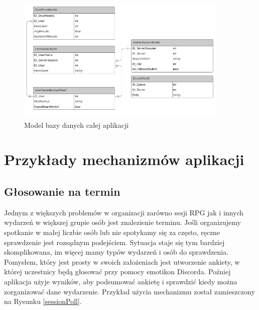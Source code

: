 \documentclass[shortabstract,inz]{iithesis}
\begin{document}
		

		\begin{figure}[h!]
			\centering
			\includegraphics[width=0.90\textwidth]{dbmodels}
			\caption{Model bazy danych całej aplikacji}
		\end{figure}
	
	
		\section{Przykłady mechanizmów aplikacji}
			\subsection{Głosowanie na termin}
			Jednym z większych problemów w organizacji zarówno sesji RPG jak i innych wydarzeń w większej grupie osób jest znalezienie terminu. Jeśli organizujemy spotkanie w małej liczbie osób lub nie spotykamy się za często, ręczne sprawdzenie jest rozsądnym podejściem. Sytuacja staje się tym bardziej skomplikowana, im więcej mamy typów wydarzeń i osób do sprawdzenia. Pomysłem, który jest prosty w swoich założeniach jest utworzenie ankiety, w której uczestnicy będą głosować przy pomocy emotikon Discorda. Poźniej aplikacja użyje wyników, aby podsumować ankietę i sprawdzić kiedy można zorganizować dane wydarzenie. Przykład użycia mechanizmu został zamieszczony na Rysunku \ref{sessionPoll}.
		
\end{document}
